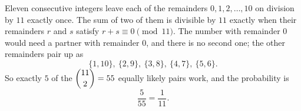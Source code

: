 Eleven consecutive integers leave each of the remainders $0,1,2,\dots,10$ on division by $11$ exactly once. The sum of two of them is divisible by $11$ exactly when their remainders $r$ and $s$ satisfy $r+s\equiv0\pmod{11}$. The number with remainder $0$ would need a partner with remainder $0$, and there is no second one; the other remainders pair up as
\[\{1,10\},\ \{2,9\},\ \{3,8\},\ \{4,7\},\ \{5,6\}.\]
So exactly $5$ of the $\dbinom{11}{2}=55$ equally likely pairs work, and the probability is
\[\dfrac{5}{55}=\boxed{\dfrac{1}{11}}.\]
